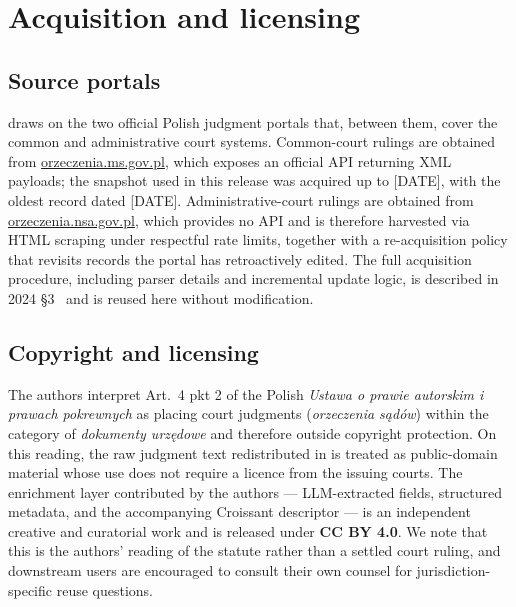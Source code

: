 
\section{Acquisition and licensing}
\label{sec:acquisition}

\subsection{Source portals}
\label{sec:acquisition:sources}

\juddgespl{} draws on the two official Polish judgment portals that, between them, cover the common and administrative court systems. Common-court rulings are obtained from \url{orzeczenia.ms.gov.pl}, which exposes an official API returning XML payloads; the snapshot used in this release was acquired up to [DATE], with the oldest record dated [DATE]. Administrative-court rulings are obtained from \url{orzeczenia.nsa.gov.pl}, which provides no API and is therefore harvested via HTML scraping under respectful rate limits, together with a re-acquisition policy that revisits records the portal has retroactively edited. The full acquisition procedure, including parser details and incremental update logic, is described in \juddges{} 2024 \S3~\citep{augustyniak2024juddges} and is reused here without modification.

\subsection{Copyright and licensing}
\label{sec:acquisition:copyright}

The authors interpret Art.~4 pkt 2 of the Polish \emph{Ustawa o prawie autorskim i prawach pokrewnych} as placing court judgments (\emph{orzeczenia s\k{a}d\'ow}) within the category of \emph{dokumenty urz\k{e}dowe} and therefore outside copyright protection. On this reading, the raw judgment text redistributed in \juddgespl{} is treated as public-domain material whose use does not require a licence from the issuing courts. The enrichment layer contributed by the authors --- LLM-extracted fields, structured metadata, and the accompanying Croissant descriptor --- is an independent creative and curatorial work and is released under \textbf{CC BY 4.0}. We note that this is the authors' reading of the statute rather than a settled court ruling, and downstream users are encouraged to consult their own counsel for jurisdiction-specific reuse questions.

